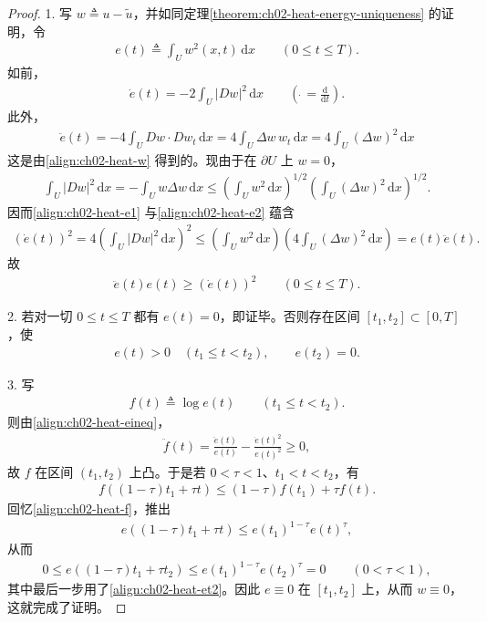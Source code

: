 \documentclass[../../main.tex]{subfiles}
\begin{document}
\begin{proof}
1. 写 $w\triangleq u-\widetilde{u}$，并如同定理\cref{theorem:ch02-heat-energy-uniqueness} 的证明，令
\begin{align*}
e(t)\triangleq\int_U w^2(x,t)\,\mathrm{d}x \qquad (0\leqslant t\leqslant T).
\end{align*}
如前，
\begin{align}\label{align:ch02-heat-e1}
\dot{e}(t)=-2\int_U|Dw|^2\,\mathrm{d}x \qquad \left(\dot{\ }=\frac{\mathrm{d}}{\mathrm{d}t}\right).
\end{align}
此外，
\begin{align}\label{align:ch02-heat-e2}
\ddot{e}(t)=-4\int_U Dw\cdot Dw_t\,\mathrm{d}x=4\int_U\Delta w\, w_t\,\mathrm{d}x=4\int_U(\Delta w)^2\,\mathrm{d}x
\end{align}
这是由\eqref{align:ch02-heat-w} 得到的。现由于在 $\partial U$ 上 $w=0$，
\begin{align*}
\int_U|Dw|^2\,\mathrm{d}x=-\int_U w\Delta w\,\mathrm{d}x
\leqslant\left(\int_U w^2\,\mathrm{d}x\right)^{1/2}\left(\int_U(\Delta w)^2\,\mathrm{d}x\right)^{1/2}.
\end{align*}
因而\eqref{align:ch02-heat-e1} 与\eqref{align:ch02-heat-e2} 蕴含
\begin{align*}
(\dot{e}(t))^2=4\left(\int_U|Dw|^2\,\mathrm{d}x\right)^2
\leqslant\left(\int_U w^2\,\mathrm{d}x\right)\left(4\int_U(\Delta w)^2\,\mathrm{d}x\right)=e(t)\ddot{e}(t).
\end{align*}
故
\begin{align}\label{align:ch02-heat-eineq}
\ddot{e}(t)e(t)\geqslant(\dot{e}(t))^2 \qquad (0\leqslant t\leqslant T).
\end{align}

2. 若对一切 $0\leqslant t\leqslant T$ 都有 $e(t)=0$，即证毕。否则存在区间 $[t_1,t_2]\subset[0,T]$，使
\begin{align}\label{align:ch02-heat-et2}
e(t)>0 \quad (t_1\leqslant t<t_2),\qquad e(t_2)=0.
\end{align}

3. 写
\begin{align}\label{align:ch02-heat-f}
f(t)\triangleq\log e(t) \qquad (t_1\leqslant t<t_2).
\end{align}
则由\eqref{align:ch02-heat-eineq}，
\begin{align*}
\ddot{f}(t)=\frac{\ddot{e}(t)}{e(t)}-\frac{\dot{e}(t)^2}{e(t)^2}\geqslant 0,
\end{align*}
故 $f$ 在区间 $(t_1,t_2)$ 上凸。于是若 $0<\tau<1$、$t_1<t<t_2$，有
\begin{align*}
f((1-\tau)t_1+\tau t)\leqslant(1-\tau)f(t_1)+\tau f(t).
\end{align*}
回忆\eqref{align:ch02-heat-f}，推出
\begin{align*}
e((1-\tau)t_1+\tau t)\leqslant e(t_1)^{1-\tau}e(t)^\tau,
\end{align*}
从而
\begin{align*}
0\leqslant e((1-\tau)t_1+\tau t_2)\leqslant e(t_1)^{1-\tau}e(t_2)^\tau=0 \qquad (0<\tau<1),
\end{align*}
其中最后一步用了\eqref{align:ch02-heat-et2}。因此 $e\equiv 0$ 在 $[t_1,t_2]$ 上，从而 $w\equiv 0$，这就完成了证明。
\end{proof}
\end{document}
